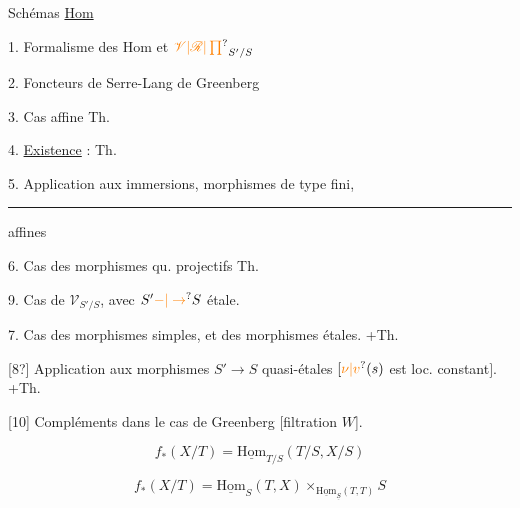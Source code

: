 

Schémas \uline{Hom}  

1. Formalisme des $\mathrm{Hom}$ et $\unsure{\mathscr{V}|\mathscr{R}|\prod}_{S'/S}$

2.   Foncteurs de Serre-Lang  de Greenberg

3.  Cas affine \hfill Th.

4. \uline{Existence}  :  \hfill Th.

5. Application aux immersions, morphismes de type fini, \hfill \rule{1.5cm}{0.35pt} affines

6. Cas des morphismes qu. projectifs \hfill Th.


9.  Cas de $\mathscr{V}_{S'/S}$, avec $S'\unsure{-|\to}S$ étale.


7. Cas des morphismes simples, et des morphismes étales. \hfill +Th.

[8?] Application aux morphismes $S'\to S$ quasi-étales $[\unsure{\nu|v}(s)$ est loc. constant$]$. \hfill +Th.

[10] Compléments dans le cas de Greenberg [filtration  $W$].



\[
f_*(X/T)=\underline{\mathrm{Hom}}_{T/S}(T/S,X/S)
\]

\[
f_*(X/T)=\underline{\mathrm{Hom}}_{S}(T,X)\times_{\underline{\mathrm{Hom}}_{\underline S}(T,T)}S
\]

